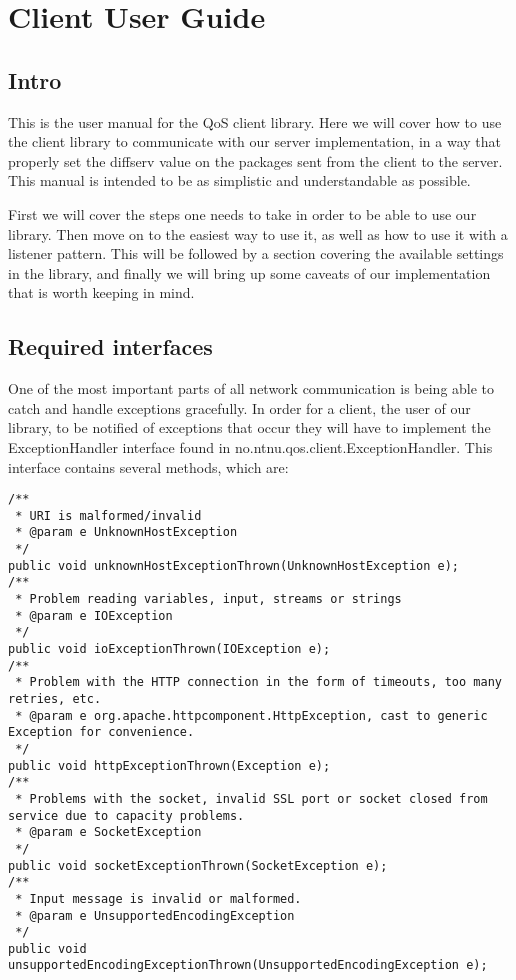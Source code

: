 \section{Client User Guide}\label{Client User Guide} 
    
    \subsection{Intro}\label{userguideIntro}
    
    This is the user manual for the QoS client library. Here we will cover how to use the client library to communicate with our server implementation, in a way that properly set the diffserv value on the packages sent from the client to the server. This manual is intended to be as simplistic and understandable as possible.

    First we will cover the steps one needs to take in order to be able to use our library. Then move on to the easiest way to use it, as well as how to use it with a listener pattern. This will be followed by a section covering the available settings in the library, and finally we will bring up some caveats of our implementation that is worth keeping in mind.

    \subsection{Required interfaces}\label{userguideReqiredInterfaces}
    
    One of the most important parts of all network communication is being able to catch and handle exceptions gracefully. In order for a client, the user of our library, to be notified of exceptions that occur they will have to implement the ExceptionHandler interface found in no.ntnu.qos.client.ExceptionHandler. This interface contains several methods, which are:

\lstset{language=java, style=eclipse}
\lstset{frame=single}
\lstset{breaklines=true}
\begin{lstlisting}[caption={ExceptionHandler interface}, label=userguideExceptionHandler]
/**
 * URI is malformed/invalid
 * @param e UnknownHostException
 */
public void unknownHostExceptionThrown(UnknownHostException e);
/**
 * Problem reading variables, input, streams or strings
 * @param e IOException
 */
public void ioExceptionThrown(IOException e);
/**
 * Problem with the HTTP connection in the form of timeouts, too many retries, etc.
 * @param e org.apache.httpcomponent.HttpException, cast to generic Exception for convenience.
 */
public void httpExceptionThrown(Exception e);
/**
 * Problems with the socket, invalid SSL port or socket closed from service due to capacity problems.
 * @param e SocketException
 */
public void socketExceptionThrown(SocketException e);
/**
 * Input message is invalid or malformed.
 * @param e UnsupportedEncodingException
 */
public void unsupportedEncodingExceptionThrown(UnsupportedEncodingException e);
\end{lstlisting}

